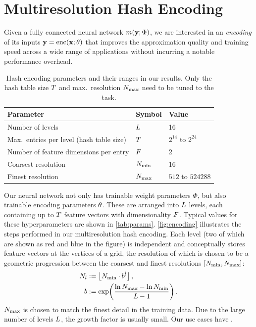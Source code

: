 \documentclass[acmtog,authorversion]{acmart}
\begin{document}
\section{Multiresolution Hash Encoding}
\label{Sec:Algorithm}

Given a fully connected neural network $m(\mathbf{y}; \Phi)$, we are interested in an \emph{encoding} of its inputs ${\mathbf{y} = \mathrm{enc}(\mathbf{x}; \theta)}$ that improves the approximation quality and training speed across a wide range of applications without incurring a notable performance overhead.
\begin{table}
  \small
  \vspace{1mm}
  \caption{\label{tab:params}Hash encoding parameters and their ranges in our results. Only the hash table size $\entriesPerLevel$ and max.\ resolution $\maxResolution$ need to be tuned to the task.}%
  \vspace{-4mm}
  \begin{tabularx}{\linewidth}{llR}%
    \toprule%
    Parameter & Symbol & Value \\
    \midrule%
    Number of levels & $L$ & 16 \\
    Max.\ entries per level (hash table size) & $\entriesPerLevel$ & $2^{14}$ to $2^{24}$ \\            
    Number of feature dimensions per entry & $F$ & 2 \\
    Coarsest resolution & $N_\mathrm{min}$ & $16$ \\
    Finest resolution & $\maxResolution$ & $512$ to $524288$ \\
    \bottomrule%
  \end{tabularx}
  \vspace{-3mm}
\end{table}
Our neural network not only has trainable weight parameters $\Phi$, but also trainable encoding parameters $\theta$.
These are arranged into $L$ levels, each containing up to $\entriesPerLevel$ feature vectors with dimensionality $F$.
Typical values for these hyperparameters are shown in \autoref{tab:params}. 
\autoref{fig:encoding} illustrates the steps performed in our multiresolution hash encoding. Each level (two of which are shown as red and blue in the figure) is independent and conceptually stores feature vectors at the vertices of a grid, the resolution of which is chosen to be a geometric progression between the coarsest and finest resolutions $[N_\mathrm{min}, N_\mathrm{max}]$:
\begin{align}
  \resolution_\level &:= \left\lfloor \minResolution \cdot \perLevelScale^\level \right\rfloor \,,\\
  \perLevelScale &:= \exp\left( \frac{\ln{\maxResolution} - \ln{\minResolution}}{\levels-1} \right) \,.\label{Eqn:PerLevelScale}
\end{align}
${N_\mathrm{max}}$ is chosen to match the finest detail in the training data. Due to the large number of levels $L$, the growth factor is usually small. Our use cases have \ADD{${\perLevelScale \in [1.26, 2]}$}.
\end{document}
